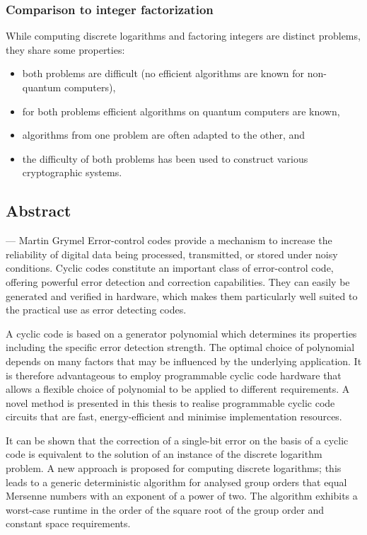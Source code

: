 \documentclass[a4paper, 11pt]{article}
\begin{document}
\subsubsection{Comparison to integer factorization}
While computing discrete logarithms and factoring integers are distinct problems, they share some properties:

\begin{itemize}
	\setlength{\itemsep}{-2pt}
	\item both problems are difficult (no efficient algorithms are known for non-quantum computers),
	\item for both problems efficient algorithms on quantum computers are known,
	\item algorithms from one problem are often adapted to the other, and
	\item the difficulty of both problems has been used to construct various cryptographic systems.
\end{itemize}

\subsection{Abstract} --- Martin Grymel
Error-control codes provide a mechanism to increase the reliability of digital data being processed, transmitted, or stored under noisy conditions. Cyclic codes constitute an important class of error-control code, offering powerful error detection and correction capabilities. They can easily be generated and verified in hardware, which makes them particularly well suited to the practical use as error detecting codes.

A cyclic code is based on a generator polynomial which determines its properties including the specific error detection strength. The optimal choice of polynomial depends on many factors that may be influenced by the underlying application. It is therefore advantageous to employ programmable cyclic code hardware that allows a flexible choice of polynomial to be applied to different requirements. A novel method is presented in this thesis to realise programmable cyclic code circuits that are fast, energy-efficient and minimise implementation resources.

It can be shown that the correction of a single-bit error on the basis of a cyclic code is equivalent to the solution of an instance of the discrete logarithm problem. A new approach is proposed for computing discrete logarithms; this leads to a generic deterministic algorithm for analysed group orders that equal Mersenne numbers with an exponent of a power of two. The algorithm exhibits a worst-case runtime in the order of the square root of the group order and constant space requirements.
\end{document}

